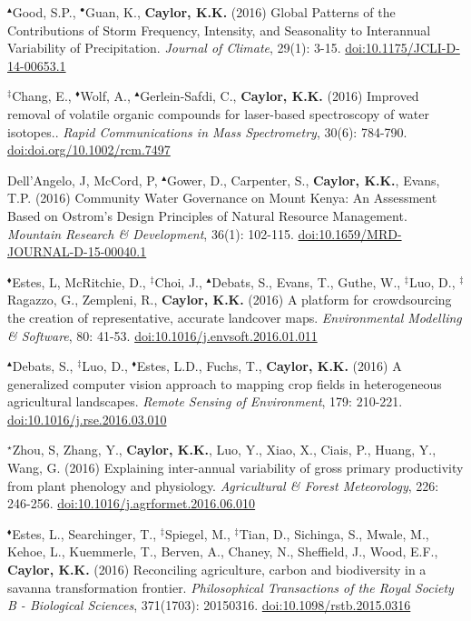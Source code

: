 \begin{etaremune}
\item $^{\blacktriangle}$Good, S.P., $^{\bullet}$Guan, K., \textbf{ Caylor, K.K.} (2016) Global Patterns of the Contributions of Storm Frequency, Intensity, and Seasonality to Interannual Variability of Precipitation. \emph{Journal of Climate}, 29(1): 3-15. \href{https://doi.org/10.1175/JCLI-D-14-00653.1}{doi:10.1175/JCLI-D-14-00653.1}
\item $^{\ddagger}$Chang, E., $^{\blacklozenge}$Wolf, A., $^{\blacktriangle}$Gerlein-Safdi, C., \textbf{ Caylor, K.K.} (2016) Improved removal of volatile organic compounds for laser-based spectroscopy of water isotopes.. \emph{Rapid Communications in Mass Spectrometry}, 30(6): 784-790. \href{https://doi.org/doi.org/10.1002/rcm.7497}{doi:doi.org/10.1002/rcm.7497}
\item Dell'Angelo, J, McCord, P, $^{\blacktriangle}$Gower, D., Carpenter, S., \textbf{ Caylor, K.K.}, Evans, T.P. (2016) Community Water Governance on Mount Kenya: An Assessment Based on Ostrom's Design Principles of Natural Resource Management. \emph{Mountain Research \& Development}, 36(1): 102-115. \href{https://doi.org/10.1659/MRD-JOURNAL-D-15-00040.1}{doi:10.1659/MRD-JOURNAL-D-15-00040.1}
\item $^{\blacklozenge}$Estes, L, McRitchie, D., $^{\ddagger}$Choi, J., $^{\blacktriangle}$Debats, S., Evans, T., Guthe, W., $^{\ddagger}$Luo, D., $^{\ddagger}$Ragazzo, G., Zempleni, R., \textbf{ Caylor, K.K.} (2016) A platform for crowdsourcing the creation of representative, accurate landcover maps. \emph{Environmental Modelling \& Software}, 80: 41-53. \href{https://doi.org/10.1016/j.envsoft.2016.01.011}{doi:10.1016/j.envsoft.2016.01.011}
\item $^{\blacktriangle}$Debats, S., $^{\ddagger}$Luo, D., $^{\blacklozenge}$Estes, L.D., Fuchs, T., \textbf{ Caylor, K.K.} (2016) A generalized computer vision approach to mapping crop fields in heterogeneous agricultural landscapes. \emph{Remote Sensing of Environment}, 179: 210-221. \href{https://doi.org/10.1016/j.rse.2016.03.010}{doi:10.1016/j.rse.2016.03.010}
\item $^{\star}$Zhou, S, Zhang, Y., \textbf{ Caylor, K.K.}, Luo, Y., Xiao, X., Ciais, P., Huang, Y., Wang, G. (2016) Explaining inter-annual variability of gross primary productivity from plant phenology and physiology. \emph{Agricultural \& Forest Meteorology}, 226: 246-256. \href{https://doi.org/10.1016/j.agrformet.2016.06.010}{doi:10.1016/j.agrformet.2016.06.010}
\item $^{\blacklozenge}$Estes, L., Searchinger, T., $^{\ddagger}$Spiegel, M., $^{\ddagger}$Tian, D., Sichinga, S., Mwale, M., Kehoe, L., Kuemmerle, T., Berven, A., Chaney, N., Sheffield, J., Wood, E.F., \textbf{ Caylor, K.K.} (2016) Reconciling agriculture, carbon and biodiversity in a savanna transformation frontier. \emph{Philosophical Transactions of the Royal Society B - Biological Sciences}, 371(1703): 20150316. \href{https://doi.org/10.1098/rstb.2015.0316}{doi:10.1098/rstb.2015.0316}

\end{etaremune}
